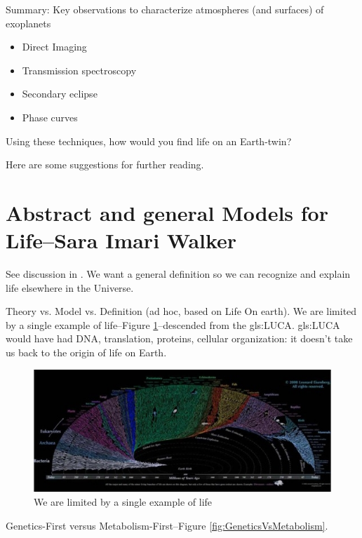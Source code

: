 \documentclass[]{article}
\begin{document}
Summary: Key observations to characterize atmospheres (and surfaces) of exoplanets
\begin{itemize}
	\item Direct Imaging
	\item  Transmission spectroscopy
	\item  Secondary eclipse
	\item  Phase curves
\end{itemize}
Using these techniques, how would you find life on an Earth-twin?


Here are some suggestions for further reading.

\cite{fujii2018exoplanet,sagan1993search,kaltenegger2017characterize,robinson2011earth,deming2013infrared,knutson2007map}



\section[Abstract and general Models for Life]{Abstract and general Models for Life--Sara Imari Walker}

See discussion in \cite{trifonov2011vocabulary}. We want a general definition so we can recognize and explain life elsewhere in the Universe.

Theory vs. Model vs. Definition (ad hoc, based on Life On earth). We are limited by a single example of life--Figure \ref{fig:yatol}--descended from the \gls{gls:LUCA}. \gls{gls:LUCA} would have had DNA, translation, proteins, cellular organization: it doesn't take us back to the origin of life on Earth.

\begin{figure}[H]
	\caption{We are limited by a single example of life}\label{fig:yatol}
	\includegraphics[width=\textwidth]{YATOL}
\end{figure}

Genetics-First versus Metabolism-First--Figure \ref{fig:GeneticsVsMetabolism}.
\end{document}
